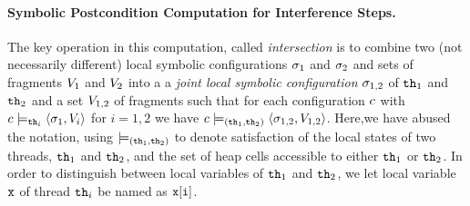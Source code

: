 \paragraph{Symbolic Postcondition Computation for Interference Steps.} 
The key operation in this computation, called {\em intersection}
is to combine two (not necessarily different) local symbolic configurations
$\sigma_1$ and $\sigma_2$ and sets of fragments
$V_1$ and $V_2$ into a
a {\em joint local symbolic configuration} $\sigma_{1,2}$ of
${\tt th}_1$ and ${\tt th}_2$ and a set $V_{1,2}$ of fragments such that
for each configuration $c$ with
$c \models_{{\tt th}_i} \left\langle\sigma_1,V_i\right\rangle$ for $i=1,2$ we have
$c \models_{({\tt th}_1,{\tt th}_2)} \left\langle\sigma_{1,2},V_{1,2}\right\rangle$. Here,we have abused the notation, using
$\models_{({\tt th}_1,{\tt th}_2)}$ to denote satisfaction of the local states of
two threads, ${\tt th}_1$ and ${\tt th}_2$, and the set of heap cells accessible to
either ${\tt th}_1$ or ${\tt th}_2$.
In order to distinguish
between local variables of ${\tt th}_1$ and ${\tt th}_2$, we let local variable
$\mathtt{x}$ of thread ${\tt th}_i$ be named as $\mathtt{x[i]}$.

